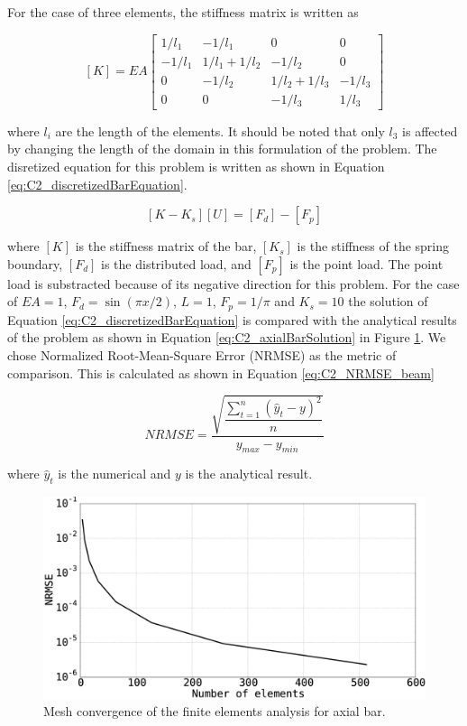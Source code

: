 For the case of three elements, the stiffness matrix is written as

\begin{equation}\label{eq:C2_stiffnessMatrixOfBar}
	[K] = 
	EA
	\begin{bmatrix}
	1/l_1 & -1/l_1 & 0 & 0 \\
	-1/l_1 & 1/l_1 + 1/l_2 & -1/l_2 & 0 \\
	0 & -1/l_2 & 1/l_2 + 1/l_3 & -1/l_3 \\
	0 & 0 & -1/l_3 & 1/l_3
	\end{bmatrix}
\end{equation}

where $l_i$ are the length of the elements. It should be noted that only $l_3$ is affected by changing the length of the domain in this formulation of the problem. The disretized equation for this problem is written as shown in Equation \eqref{eq:C2_discretizedBarEquation}.

\begin{equation}\label{eq:C2_discretizedBarEquation}
	[K - K_s] [U] = [F_d] - [F_p]
\end{equation}

where $[K]$ is the stiffness matrix of the bar, $[K_s]$ is the stiffness of the spring boundary, $[F_d]$ is the distributed load, and $[F_p]$ is the point load. The point load is substracted because of its negative direction for this problem. For the case of $EA = 1$, $F_d = \sin(\pi x / 2)$, $L = 1$, $F_p = 1 / \pi$ and $K_s = 10$ the solution of Equation \eqref{eq:C2_discretizedBarEquation} is compared with the analytical results of the problem as shown in Equation \eqref{eq:C2_axialBarSolution} in Figure \ref{fig:C2_axialBarSolution}. We chose Normalized Root-Mean-Square Error (NRMSE) as the metric of comparison. This is calculated as shown in Equation \eqref{eq:C2_NRMSE_beam}

\begin{equation}\label{eq:C2_NRMSE_beam}
	NRMSE = \dfrac{\sqrt{\dfrac{\sum_{t=1}^n \left( \hat{y}_t - y \right)^2}{n}}}{y_{max} - y_{min}}
\end{equation}

where $\hat{y}_t$ is the numerical and $y$ is the analytical result.

\begin{figure}[h]
	\centering
	\includegraphics[width=14.00cm]{Chapter_2/figure/axial_bar_governing_equation_mesh_convergence.eps}
	\caption{Mesh convergence of the finite elements analysis for axial bar.}
	\label{fig:C2_axialBarSolution}
\end{figure}


